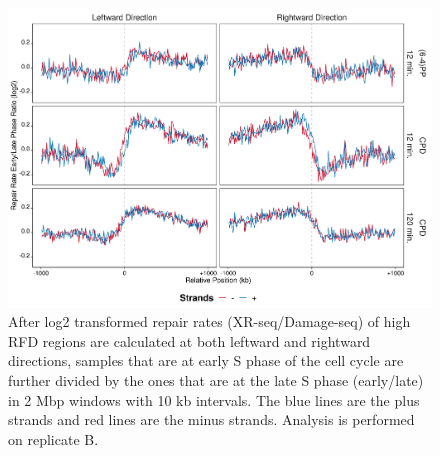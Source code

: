 \begin{figure}[H]
\begin{center}
\includegraphics[width=\textwidth]{Chapters/7_appendix/figures/supfig73}
\caption[Repair rate early/late ratio of high RFDs in 2 Mbp (replicate B).]{After log2 transformed repair rates (XR-seq/Damage-seq) of high RFD regions are calculated at both leftward and rightward directions, samples that are at early S phase of the cell cycle are further divided by the ones that are at the late S phase (early/late) in 2 Mbp windows with 10 kb intervals. The blue lines are the plus strands and red lines are the minus strands. Analysis is performed on replicate B.}
\label{supfig:rrel2000rfdB}
\end{center}
\end{figure}

